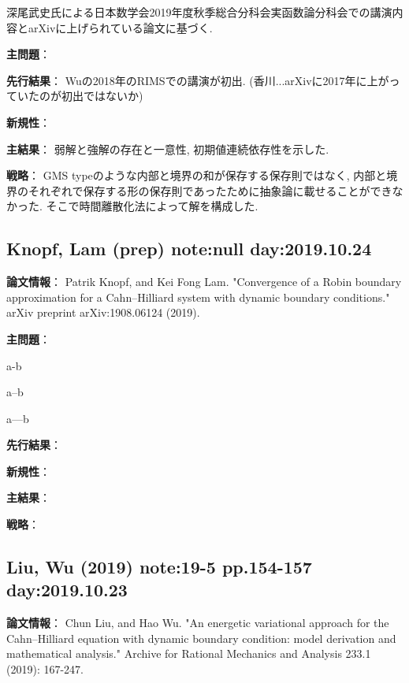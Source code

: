 \documentclass[openary, a4paper, oneside]{jsarticle}
\begin{document}
深尾武史氏による日本数学会2019年度秋季総合分科会実函数論分科会での講演内容とarXivに上げられている論文に基づく.

{\bf 主問題}：

{\bf 先行結果}：
Wuの2018年のRIMSでの講演が初出.
(香川...arXivに2017年に上がっていたのが初出ではないか)

{\bf 新規性}：

{\bf 主結果}：
弱解と強解の存在と一意性, 初期値連続依存性を示した.

{\bf 戦略}：
GMS typeのような内部と境界の和が保存する保存則ではなく, 内部と境界のそれぞれで保存する形の保存則であったために抽象論に載せることができなかった.
そこで時間離散化法によって解を構成した.



\newpage

\subsection{Knopf, Lam (prep) note:null day:2019.10.24}
{\bf 論文情報}：
Patrik Knopf, and Kei Fong Lam. "Convergence of a Robin boundary approximation for a Cahn--Hilliard system with dynamic boundary conditions." arXiv preprint arXiv:1908.06124 (2019).

{\bf 主問題}：

a-b

a--b

a---b

{\bf 先行結果}：

{\bf 新規性}：

{\bf 主結果}：

{\bf 戦略}：


\newpage

\subsection{Liu, Wu (2019) \cite{LiuWu2019} note:19-5 pp.154-157 day:2019.10.23}
{\bf 論文情報}：
Chun Liu, and Hao Wu. "An energetic variational approach for the Cahn–Hilliard equation with dynamic boundary condition: model derivation and mathematical analysis." Archive for Rational Mechanics and Analysis 233.1 (2019): 167-247.
\end{document}
